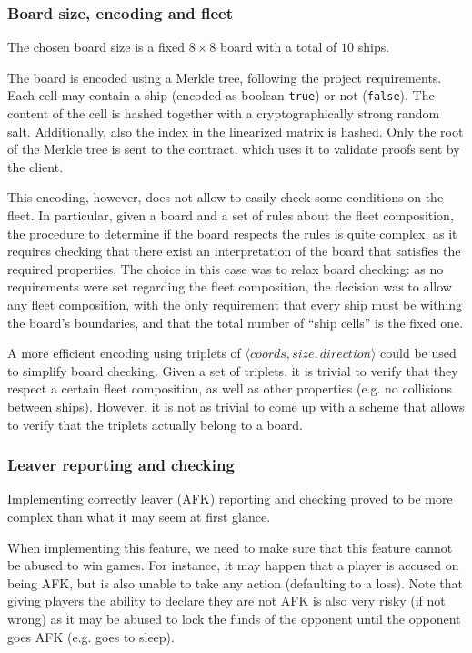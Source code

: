 \subsubsection{Board size, encoding and fleet}
\label{sec:implementation-contract-board}
The chosen board size is a fixed $8 \times 8$ board with a total of $10$ ships.

The board is encoded using a Merkle tree, following the project requirements.
Each cell may contain a ship (encoded as boolean \texttt{true})
or not (\texttt{false}). The content of the cell is hashed
together with a cryptographically strong random salt. Additionally, also the
index in the linearized matrix is hashed. Only the root of the Merkle tree is
sent to the contract, which uses it to validate proofs sent by the client.

This encoding, however, does not allow to easily check some conditions on the
fleet. In particular, given a board and a set of rules about the fleet
composition, the procedure to determine if the board respects the rules is
quite complex, as it requires checking that there exist an interpretation of
the board that satisfies the required properties. The choice in this case was
to relax board checking: as no requirements were set regarding the fleet
composition, the decision was to allow any fleet composition, with the only
requirement that every ship must be withing the board's boundaries, and that
the total number of ``ship cells'' is the fixed one.

A more efficient encoding using triplets of $\langle coords, size,
	direction\rangle$ could be used to simplify board checking. Given a set of
triplets, it is trivial to verify that they respect a certain fleet
composition, as well as other properties (e.g. no collisions between ships).
However, it is not as trivial to come up with a scheme that allows to verify
that the triplets actually belong to a board.

\subsubsection{Leaver reporting and checking}
\label{sec:implementation-contract-leaver-reporting}
Implementing correctly leaver (AFK) reporting and checking proved to be more
complex than what it may seem at first glance.

When implementing this feature, we need to make sure that this feature cannot
be abused to win games. For instance, it may happen that a player is accused on
being AFK, but is also unable to take any action (defaulting to a loss). Note
that giving players the ability to declare they are not AFK is also very risky
(if not wrong) as it may be abused to lock the funds of the opponent until the
opponent goes AFK (e.g. goes to sleep).

